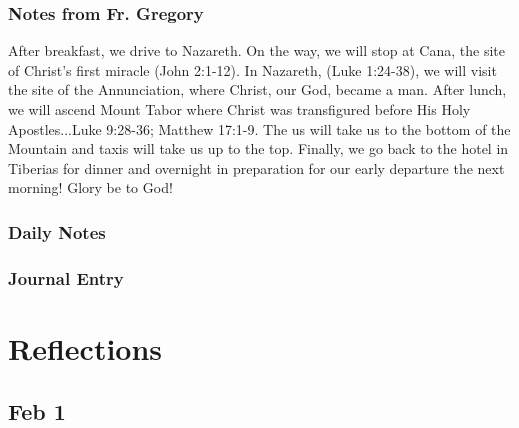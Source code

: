 \documentclass[letterpaper]{report}
\begin{document}
\subsection{Notes from Fr. Gregory}
After breakfast, we drive to Nazareth. On the way, we will stop at Cana, the site of Christ's first miracle (John 2:1-12). In Nazareth, (Luke 1:24-38), we will visit the site of the Annunciation, where Christ, our God, became a man.  After lunch, we will ascend Mount Tabor where Christ was transfigured before His Holy Apostles...Luke 9:28-36; Matthew 17:1-9. The us will take us to the bottom of the Mountain and taxis will take us up to the top. Finally, we go back to the hotel in Tiberias for dinner and overnight in preparation for our early departure the next morning! Glory be to God!

\subsection{Daily Notes}

\clearpage
\subsection{Journal Entry}

\chapter{Reflections}
\section{Feb 1}
\end{document}
